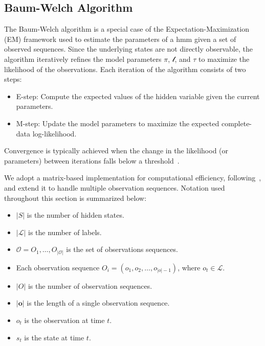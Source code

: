 \subsection{Baum-Welch Algorithm}\label{subsec:baum-welch}
The Baum-Welch algorithm is a special case of the Expectation-Maximization (EM) framework used to estimate the parameters of a \gls{hmm} given a set of observed sequences.
Since the underlying states are not directly observable, the algorithm iteratively refines the model parameters $\pi$, $\mathscr{l}$, and $\tau$ to maximize the likelihood of the observations.
Each iteration of the algorithm consists of two steps:
\begin{itemize}
    \item E-step: Compute the expected values of the hidden variable given the current parameters.
    \item M-step: Update the model parameters to maximize the expected complete-data log-likelihood.
\end{itemize}

Convergence is typically achieved when the change in the likelihood (or parameters) between iterations falls below a threshold~\cite{Rabiner89}.

We adopt a matrix-based implementation for computational efficiency, following~\cite{aaholmbaum}, and extend it to handle multiple observation sequences.
Notation used throughout this section is summarized below:
\begin{itemize}
    \item $|S|$ is the number of hidden states.
    \item $|\mathcal{L}|$ is the number of labels.
    \item $\mathcal{O} = {O_1, \ldots, O_{|\mathcal{O}|}}$  is the set of observations sequences.
    \item Each observation sequence $O_i = (o_{1}, o_{2}, \ldots, o_{|o|-1 })$, where $o_{t} \in \mathcal{L}$.
    \item $|O|$ is the number of observation sequences.
    \item $|\mathbf{o}|$ is the length of a single observation sequence.
    \item $o_t$ is the observation at time $t$.
    \item $s_t$ is the state at time $t$.
\end{itemize}

